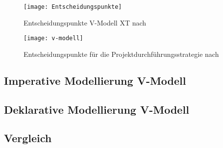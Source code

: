  
 
 \begin{figure}[htp]
\begin{center}
  \texttt{[image: Entscheidungspunkte]} %
  \caption{Entscheidungspunkte V-Modell XT nach \cite{2004vmodell}}
  \label{fig:entscheidungspunkte}
\end{center}
\end{figure}
 
\begin{sidewaysfigure}[htp]
\begin{center}
  \texttt{[image: v-modell]} %
  \caption{Entscheidungspunkte für die Projektdurchführungsstrategie nach \cite{2004vmodell}}
  \label{fig:v-modell}
\end{center}
\end{sidewaysfigure}
\subsection{Imperative Modellierung V-Modell}
\subsection{Deklarative Modellierung V-Modell}
\subsection{Vergleich}



